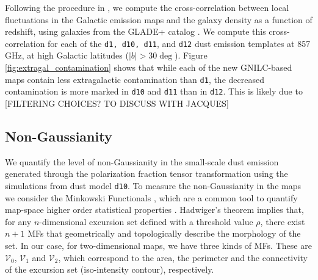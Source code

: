 \documentclass[twocolumn]{aastex631}
\begin{document}
Following the procedure in \citet{Chiang:2019}, we compute the cross-correlation between local fluctuations in the Galactic emission maps and the galaxy density as a function of redshift, using galaxies from the GLADE+ catalog \citep{Dalya:2022}. We compute this cross-correlation for each of the \texttt{d1, d10, d11}, and \texttt{d12} dust emission templates at 857 GHz, at high Galactic latitudes ($\left|b\right| > 30\deg$). Figure \ref{fig:extragal_contamination} shows that while each of the new GNILC-based maps contain less extragalactic contamination than \texttt{d1}, the decreased contamination is more marked in \texttt{d10} and \texttt{d11} than in \texttt{d12}. This is likely due to [FILTERING CHOICES? TO DISCUSS WITH JACQUES]


\subsection{Non-Gaussianity} \label{sec:nongaussianity}

We quantify the level of non-Gaussianity in the small-scale dust emission generated through the polarization fraction tensor transformation using the simulations from dust model \texttt{d10}. To measure the non-Gaussianity in the maps we consider the Minkowski Functionals \citep[MFs,][]{Minkowski1903}, which are a common tool to quantify map-space higher order statistical properties \citep{Martire:2023, Carones:2024}. 
Hadwiger’s theorem \citep{hadwigerVorlesungenUeberInhalt1957}
implies that, for any $n$-dimensional excursion set defined with a threshold value $\rho$, there exist $n+1$ MFs that geometrically and topologically describe the morphology of the set. In our case, for two-dimensional maps, we have three kinds of MFs. These are $\mathcal{V}_0$, $\mathcal{V}_1$ and $\mathcal{V}_2$, which correspond to the area, the perimeter and the connectivity of the excursion set (iso-intensity contour), respectively.
\end{document}
